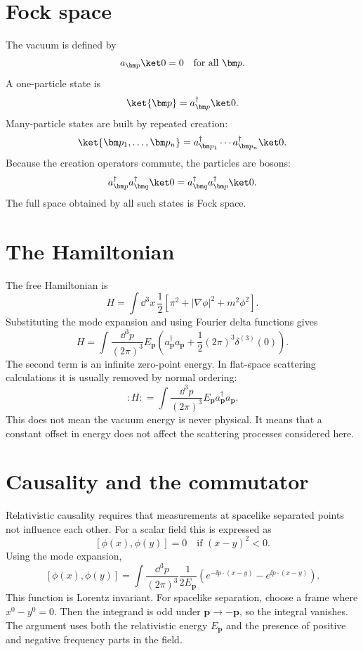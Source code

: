 
\section{Fock space}

The vacuum is defined by
\[
  a_{\bm p}\ket0=0
  \quad\text{for all }\bm p.
\]
A one-particle state is
\[
  \ket{\bm p}=a_{\bm p}^\dagger\ket0.
\]
Many-particle states are built by repeated creation:
\[
  \ket{\bm p_1,\ldots,\bm p_n}
  =
  a_{\bm p_1}^\dagger\cdots a_{\bm p_n}^\dagger\ket0.
\]
Because the creation operators commute, the particles are bosons:
\[
  a_{\bm p}^\dagger a_{\bm q}^\dagger\ket0
  =
  a_{\bm q}^\dagger a_{\bm p}^\dagger\ket0.
\]
The full space obtained by all such states is Fock space.

\section{The Hamiltonian}

The free Hamiltonian is
\[
  H=\int\dd^3x\,\frac12\left[\pi^2+|\nabla\phi|^2+m^2\phi^2\right].
\]
Substituting the mode expansion and using Fourier delta functions gives
\[
  H=
  \int\frac{\dd^3p}{(2\pi)^3}
  E_{\bm p}
  \left(a_{\bm p}^\dagger a_{\bm p}
  +\frac12(2\pi)^3\delta^{(3)}(0)\right).
\]
The second term is an infinite zero-point energy.  In flat-space scattering calculations it is usually removed by normal ordering:
\[
  :H:
  =
  \int\frac{\dd^3p}{(2\pi)^3}
  E_{\bm p}a_{\bm p}^\dagger a_{\bm p}.
\]
This does not mean the vacuum energy is never physical.  It means that a constant offset in energy does not affect the scattering processes considered here.

\section{Causality and the commutator}

Relativistic causality requires that measurements at spacelike separated points not influence each other.  For a scalar field this is expressed as
\[
  [\phi(x),\phi(y)]=0
  \quad\text{if }(x-y)^2<0.
\]
Using the mode expansion,
\[
  [\phi(x),\phi(y)]
  =
  \int\frac{\dd^3p}{(2\pi)^3}\frac1{2E_{\bm p}}
  \left(e^{-\ii p\cdot(x-y)}-e^{\ii p\cdot(x-y)}\right).
\]
This function is Lorentz invariant.  For spacelike separation, choose a frame where \(x^0-y^0=0\).  Then the integrand is odd under \(\bm p\to-\bm p\), so the integral vanishes.  The argument uses both the relativistic energy \(E_{\bm p}\) and the presence of positive and negative frequency parts in the field.

